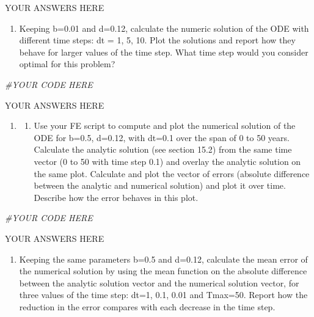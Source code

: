 \documentclass[
]{book}
\newenvironment{Shaded}{\begin{snugshade}}{\end{snugshade}}
\newcommand{\CommentTok}[1]{\textcolor[rgb]{0.56,0.35,0.01}{\textit{#1}}}
\providecommand{\tightlist}{%
  \setlength{\itemsep}{0pt}\setlength{\parskip}{0pt}}
\theoremstyle{definition}
\theoremstyle{definition}
\theoremstyle{definition}
\theoremstyle{remark}
\begin{document}
YOUR ANSWERS HERE

\begin{enumerate}
\def\labelenumi{\alph{enumi})}
\setcounter{enumi}{2}
\tightlist
\item
  Keeping b=0.01 and d=0.12, calculate the numeric solution of the ODE with different time steps: dt = 1, 5, 10. Plot the solutions and report how they behave for larger values of the time step. What time step would you consider optimal for this problem?
\end{enumerate}

\begin{Shaded}
\begin{Highlighting}[]
\CommentTok{\#YOUR CODE HERE}
\end{Highlighting}
\end{Shaded}

YOUR ANSWERS HERE

\begin{enumerate}
\def\labelenumi{\arabic{enumi}.}
\setcounter{enumi}{1}
\item
  \begin{enumerate}
  \def\labelenumii{\alph{enumii})}
  \tightlist
  \item
    Use your FE script to compute and plot the numerical solution of the ODE for b=0.5, d=0.12, with dt=0.1 over the span of 0 to 50 years. Calculate the analytic solution (see section 15.2) from the same time vector (0 to 50 with time step 0.1) and overlay the analytic solution on the same plot. Calculate and plot the vector of errors (absolute difference between the analytic and numerical solution) and plot it over time. Describe how the error behaves in this plot.
  \end{enumerate}
\end{enumerate}

\begin{Shaded}
\begin{Highlighting}[]
\CommentTok{\#YOUR CODE HERE}
\end{Highlighting}
\end{Shaded}

YOUR ANSWERS HERE

\begin{enumerate}
\def\labelenumi{\alph{enumi})}
\setcounter{enumi}{1}
\tightlist
\item
  Keeping the same parameters b=0.5 and d=0.12, calculate the mean error of the numerical solution by using the mean function on the absolute difference between the analytic solution vector and the numerical solution vector, for three values of the time step: dt=1, 0.1, 0.01 and Tmax=50. Report how the reduction in the error compares with each decrease in the time step.
\end{enumerate}
\end{document}
